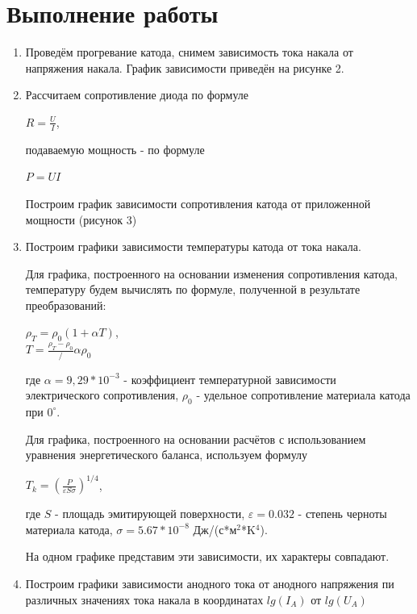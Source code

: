 \documentclass[a4paper]{article}
\begin{document}
\section{Выполнение работы}
\begin{enumerate}
    \item Проведём прогревание катода, снимем зависимость тока накала от напряжения накала. График зависимости приведён на рисунке 2.
    


\item Рассчитаем сопротивление диода по формуле 
\begin{center}
    $R = \frac{U}{I}$,
\end{center}

подаваемую мощность - по формуле

\begin{center}
    $P = U I$
\end{center}

Построим график зависимости сопротивления катода от приложенной мощности (рисунок 3)



\item Построим графики зависимости температуры катода от тока накала.  \par
Для графика, построенного на основании изменения сопротивления катода, температуру будем вычислять по формуле, полученной в результате преобразований:
\begin{center}
   $ \rho_T = \rho_0 (1 + \alpha T) $, \\
   $T = \frac{\rho_T - \rho_0}/{\alpha \rho_0}$
\end{center}
где $\alpha = 9,29 * 10^{-3}$ - коэффициент температурной зависимости электрического сопротивления, $\rho_0$ - удельное сопротивление материала катода при $0^{\circ}$. \par

Для графика, построенного на основании расчётов с использованием уравнения энергетического баланса, используем формулу 
\begin{center}
    $T_k = (\frac{P}{\varepsilon S \sigma})^{1/4}$,
\end{center}
где $S$ - площадь эмитирующей поверхности, $\varepsilon = 0.032$ - степень черноты материала катода, $\sigma = 5.67*10^{-8}$ Дж/(с*м$^2$*K$^4$). \par
На одном графике представим эти зависимости, их характеры совпадают.



\item Построим графики зависимости анодного тока от анодного напряжения пи различных значениях тока накала в координатах $lg(I_A)$ от $lg(U_A)$




\end{enumerate}
\end{document}
